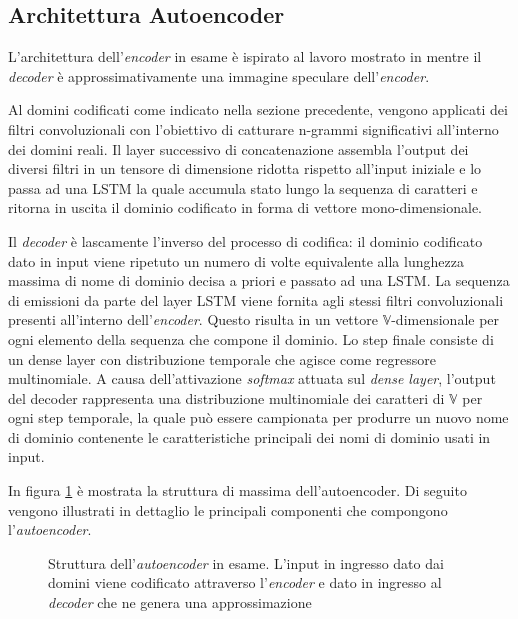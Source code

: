\subsection{Architettura Autoencoder}
\label{archautoencoder}
L'architettura dell'\textit{encoder} in esame è ispirato al lavoro mostrato in \cite{1508.06615} mentre il \textit{decoder} è approssimativamente una immagine speculare dell'\textit{encoder}.

Al domini codificati come indicato nella sezione precedente, vengono applicati dei filtri convoluzionali con l'obiettivo di catturare n-grammi significativi all'interno dei domini reali. Il layer successivo di concatenazione assembla l'output dei diversi filtri in un tensore di dimensione ridotta rispetto all'input iniziale e lo passa ad una LSTM la quale accumula stato lungo la sequenza di caratteri e ritorna in uscita il dominio codificato in forma di vettore mono-dimensionale.

Il \textit{decoder} è lascamente l'inverso del processo di codifica: il dominio codificato dato in input viene ripetuto un numero di volte equivalente alla lunghezza massima di nome di dominio decisa a priori e passato ad una LSTM. La sequenza di emissioni da parte del layer LSTM viene fornita agli stessi filtri convoluzionali presenti all'interno dell'\textit{encoder}. Questo risulta in un vettore $\mathbb{V}$-dimensionale per ogni elemento della sequenza che compone il dominio.
Lo step finale consiste di un dense layer con distribuzione temporale che agisce come regressore multinomiale. A causa dell'attivazione \textit{softmax} attuata sul \textit{dense layer}, l'output del decoder rappresenta una distribuzione multinomiale dei caratteri di $\mathbb{V}$ per ogni step temporale, la quale può essere campionata per produrre un nuovo nome di dominio contenente le caratteristiche principali dei nomi di dominio usati in input.

In figura \ref{fig:autoencoder1} è mostrata la struttura di massima dell'autoencoder. Di seguito vengono illustrati in dettaglio le principali componenti che compongono l'\textit{autoencoder}. 

\begin{figure}[!p]
    \centering
	
	\caption{Struttura dell'\textit{autoencoder} in esame. L'input in ingresso dato dai domini viene codificato attraverso l'\textit{encoder} e dato in ingresso al \textit{decoder} che ne genera una approssimazione}
\label{fig:autoencoder1}
\end{figure}

